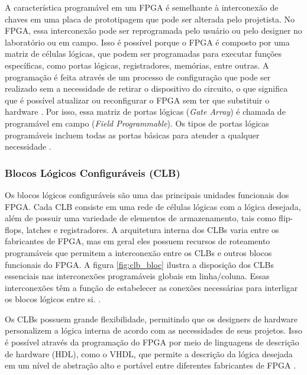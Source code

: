 A característica programável em um FPGA é semelhante à interconexão de chaves em uma placa de prototipagem que pode ser alterada pelo projetista. No FPGA, essa interconexão pode ser reprogramada pelo usuário ou pelo designer no laboratório ou em campo. Isso é possível porque o FPGA é composto por uma matriz de células lógicas, que podem ser programadas para executar funções específicas, como portas lógicas, registradores, memórias, entre outras. A programação é feita através de um processo de configuração que pode ser realizado sem a necessidade de retirar o dispositivo do circuito, o que significa que é possível atualizar ou reconfigurar o FPGA sem ter que substituir o hardware \cite{roth2004circuit}. Por isso, essa matriz de portas lógicas (\textit{Gate Array}) é chamada de programável em campo (\textit{Field Programmable}). Os tipos de portas lógicas programáveis incluem todas as portas básicas para atender a qualquer necessidade \cite{SmithFranzon08}. 

\subsubsection{Blocos Lógicos Configuráveis (CLB)}

Os blocos lógicos configuráveis são uma das principais unidades funcionais dos FPGA. Cada CLB consiste em uma rede de células lógicas com a lógica desejada, além de possuir uma variedade de elementos de armazenamento, tais como flip-flops, latches e registradores. A arquitetura interna dos CLBs varia entre os fabricantes de FPGA, mas em geral eles possuem recursos de roteamento programáveis que permitem a interconexão entre os CLBs e outros blocos funcionais do FPGA. A figura \ref{fig:clb_bloc} ilustra a disposição dos CLBs essenciais nas interconexões programáveis globais em linha/coluna. Essas interconexões têm a função de estabelecer as conexões necessárias para interligar os blocos lógicos entre si. \cite{roth2004circuit}.

Os CLBs possuem grande flexibilidade, permitindo que os designers de hardware personalizem a lógica interna de acordo com as necessidades de seus projetos. Isso é possível através da programação do FPGA por meio de linguagens de descrição de hardware (HDL), como o VHDL, que permite a descrição da lógica desejada em um nível de abstração alto e
portável entre diferentes fabricantes de FPGA \cite{silva2013introducao}.

